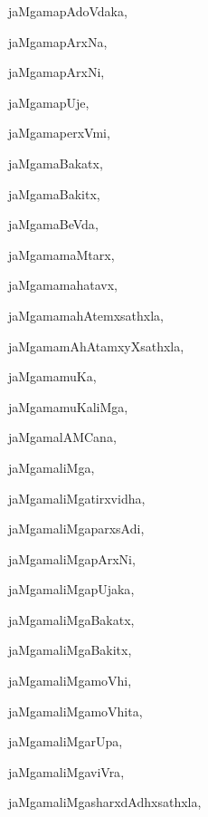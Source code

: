 \begin{multicols}{3}
{\noindent
{jaMgamapAdoVdaka}, \pageref{jaMgamapAdoVdaka}

\noindent
{jaMgamapArxNa}, \pageref{jaMgamapArxNa}

\noindent
{jaMgamapArxNi}, \pageref{jaMgamapArxNi}

\noindent
{jaMgamapUje}, \pageref{jaMgamapUje}

\noindent
{jaMgamaperxVmi}, \pageref{jaMgamaperxVmi}

\noindent
{jaMgamaBakatx}, \pageref{jaMgamaBakatx}

\noindent
{jaMgamaBakitx}, \pageref{jaMgamaBakitx}

\noindent
{jaMgamaBeVda}, \pageref{jaMgamaBeVda}

\noindent
{jaMgamamaMtarx}, \pageref{jaMgamamaMtarx}

\noindent
{jaMgamamahatavx}, \pageref{jaMgamamahatavx}

\noindent
{jaMgamamahAtemxsathxla}, \pageref{jaMgamamahAtemxsathxla}

\noindent
{jaMgamamAhAtamxyXsathxla}, \pageref{jaMgamamAhAtamxyXsathxla}

\noindent
{jaMgamamuKa}, \pageref{jaMgamamuKa}

\noindent
{jaMgamamuKaliMga}, \pageref{jaMgamamuKaliMga}

\noindent
{jaMgamalAMCana}, \pageref{jaMgamalAMCana}

\noindent
{jaMgamaliMga}, \pageref{jaMgamaliMga}

\noindent
{jaMgamaliMgatirxvidha}, \pageref{jaMgamaliMgatirxvidha}

\noindent
{jaMgamaliMgaparxsAdi}, \pageref{jaMgamaliMgaparxsAdi}

\noindent
{jaMgamaliMgapArxNi}, \pageref{jaMgamaliMgapArxNi}

\noindent
{jaMgamaliMgapUjaka}, \pageref{jaMgamaliMgapUjaka}

\noindent
{jaMgamaliMgaBakatx}, \pageref{jaMgamaliMgaBakatx}

\noindent
{jaMgamaliMgaBakitx}, \pageref{jaMgamaliMgaBakitx}

\noindent
{jaMgamaliMgamoVhi}, \pageref{jaMgamaliMgamoVhi}

\noindent
{jaMgamaliMgamoVhita}, \pageref{jaMgamaliMgamoVhita}

\noindent
{jaMgamaliMgarUpa}, \pageref{jaMgamaliMgarUpa}

\noindent
{jaMgamaliMgaviVra}, \pageref{jaMgamaliMgaviVra}

\noindent
{jaMgamaliMgasharxdAdhxsathxla}, \pageref{jaMgamaliMgasharxdAdhxsathxla}

}
\end{multicols}
